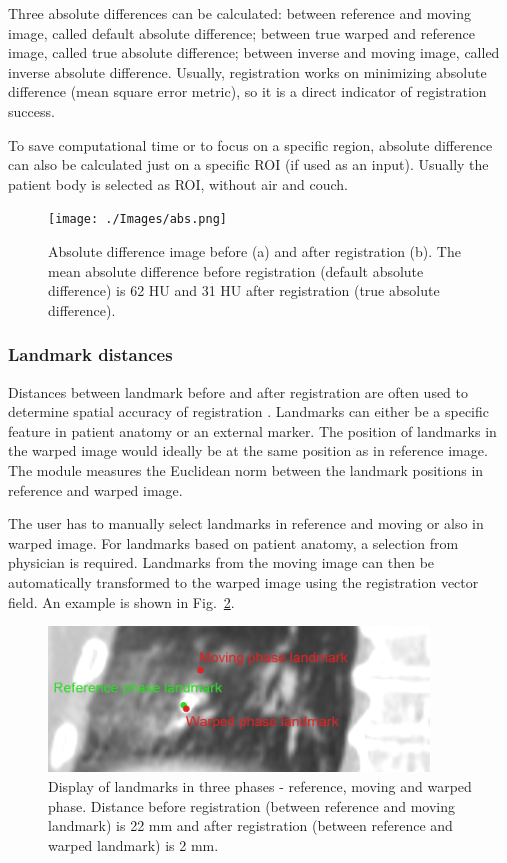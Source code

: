 \documentclass[type=dr, dr=rernat, accentcolor=tud7b,colorbacktitle, bigchapter, openright, twoside, 12pt ]{tudthesis}
\begin{document}
Three absolute differences can be calculated: between reference and moving image, called default absolute difference; between true warped and reference image, called true absolute difference; between inverse and moving image, called
inverse absolute difference. Usually, registration works on minimizing absolute difference (mean square error metric), so it is a direct indicator
of registration success.

To save computational time or to focus on a specific region, absolute difference can also be calculated just on a specific ROI (if used as an input). Usually the patient body is selected as ROI, without air and couch.


\begin{figure}[H]
	\begin{center}		
		\texttt{[image: ./Images/abs.png]}
		\caption{Absolute difference image before (a) and after registration (b). The mean absolute difference before registration (default absolute difference) is 62 HU and 31 HU after registration (true absolute difference).}
		\label{absDiff}
	\end{center}
\end{figure}


\subsubsection{Landmark distances}

Distances between landmark before and after registration are often used to determine spatial accuracy of registration \cite{Castillo2009}. 
Landmarks can either be a specific feature in patient anatomy or an external marker. The position of landmarks in the warped image would ideally 
be at the same position as in reference image. The module measures the Euclidean norm between the landmark positions in reference and warped image.

The user has to manually select landmarks in reference and moving or also in warped image. For landmarks based on patient anatomy, a selection from physician is required. 
Landmarks from the moving image can then be automatically transformed to the warped image using the registration vector field. An example is shown in Fig.~\ref{landmark}.

\begin{figure}[H]
\begin{center}
\includegraphics[width=0.9\textwidth]{./Images/landmark.png}
\caption{Display of landmarks in three phases - reference, moving and warped phase. Distance before registration (between reference and moving landmark) is 22 mm and after registration
(between reference and warped landmark) is 2 mm.}
\label{landmark}
\end{center}
\end{figure}
\end{document}

